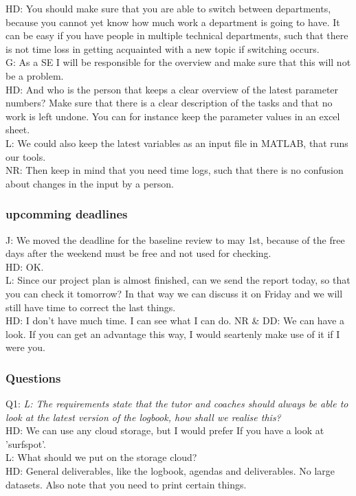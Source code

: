 HD: You should make sure that you are able to switch between departments, because you cannot yet know how much work a department is going to have. It can be easy if you have people in multiple technical departments, such that there is not time loss in getting acquainted with a new topic if switching occurs.\\
G: As a SE I will be responsible for the overview and make sure that this will not be a problem.\\
HD: And who is the person that keeps a clear overview of the latest parameter numbers? Make sure that there is a clear description of the tasks and that no work is left undone. You can for instance keep the parameter values in an excel sheet.\\
L: We could also keep the latest variables as an input file in MATLAB, that runs our tools. \\
NR: Then keep in mind that you need time logs, such that there is no confusion about changes in the input by a person.\\

\subsubsection{upcomming deadlines}
J: We moved the deadline for the baseline review to may 1st, because of the free days after the weekend must be free and not used for checking. \\
HD: OK.\\
L: Since our project plan is almost finished, can we send the report today, so that you can check it tomorrow? In that way we can discuss it on Friday and we will still have time to correct the last things.\\
HD: I don't have much time. I can see what I can do.
NR \& DD: We can have a look. If you can get an advantage this way, I would seartenly make use of it if I were you.\\

\subsubsection{Questions}
Q1: \textit{L: The requirements state that the tutor and coaches should always be able to look at the latest version of the logbook, how shall we realise this?}\\
HD: We can use any cloud storage, but I would prefer If you have a look at 'surfspot'.\\
L: What should we put on the storage cloud?\\
HD: General deliverables, like the logbook, agendas and deliverables. No large datasets. Also note that you need to print certain things. \\

